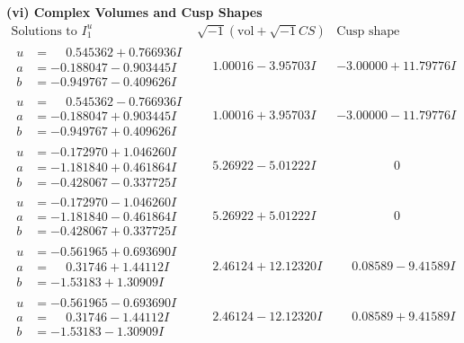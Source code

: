 \documentclass[1p]{elsarticle_modified}
\theoremstyle{definition}
\newcommand{\I}{\sqrt{-1}}
\begin{document}
\newpage\flushleft \textbf{(vi) Complex Volumes and Cusp Shapes}
$$\begin{array}{c|c|c}  
\text{Solutions to }I^u_{1}& \I (\text{vol} + \sqrt{-1}CS) & \text{Cusp shape}\\
 \hline 
\begin{aligned}
u &= \phantom{-}0.545362 + 0.766936 I \\
a &= -0.188047 - 0.903445 I \\
b &= -0.949767 - 0.409626 I\end{aligned}
 & \phantom{-}1.00016 - 3.95703 I & -3.00000 + 11.79776 I \\ \hline\begin{aligned}
u &= \phantom{-}0.545362 - 0.766936 I \\
a &= -0.188047 + 0.903445 I \\
b &= -0.949767 + 0.409626 I\end{aligned}
 & \phantom{-}1.00016 + 3.95703 I & -3.00000 - 11.79776 I \\ \hline\begin{aligned}
u &= -0.172970 + 1.046260 I \\
a &= -1.181840 + 0.461864 I \\
b &= -0.428067 - 0.337725 I\end{aligned}
 & \phantom{-}5.26922 - 5.01222 I & \phantom{-0.000000 } 0 \\ \hline\begin{aligned}
u &= -0.172970 - 1.046260 I \\
a &= -1.181840 - 0.461864 I \\
b &= -0.428067 + 0.337725 I\end{aligned}
 & \phantom{-}5.26922 + 5.01222 I & \phantom{-0.000000 } 0 \\ \hline\begin{aligned}
u &= -0.561965 + 0.693690 I \\
a &= \phantom{-}0.31746 + 1.44112 I \\
b &= -1.53183 + 1.30909 I\end{aligned}
 & \phantom{-}2.46124 + 12.12320 I & \phantom{-}0.08589 - 9.41589 I \\ \hline\begin{aligned}
u &= -0.561965 - 0.693690 I \\
a &= \phantom{-}0.31746 - 1.44112 I \\
b &= -1.53183 - 1.30909 I\end{aligned}
 & \phantom{-}2.46124 - 12.12320 I & \phantom{-}0.08589 + 9.41589 I \\ \hline\begin{aligned}

\end{aligned}
\end{array}$$
\end{document}
